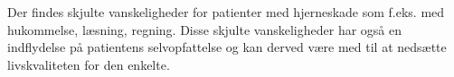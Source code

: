 Der findes skjulte vanskeligheder for patienter med hjerneskade som f.eks. med hukommelse, læsning, regning. Disse skjulte vanskeligheder har også en indflydelse på patientens selvopfattelse og  kan derved være med til at nedsætte livskvaliteten for den enkelte. \cite{Sundhedsstyrelsen2010} 





